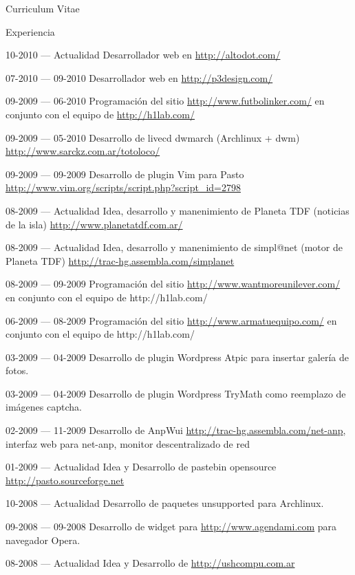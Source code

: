\documentclass[a4paper]{article}
\begin{document}
\begin{cv}{Curriculum Vitae}
    \newpage
    \begin{cvlist}{Experiencia}
      \item[10-2010 --- Actualidad] Desarrollador web en \url{http://altodot.com/}
      \item[07-2010 --- 09-2010] Desarrollador web en \url{http://p3design.com/}
      \item[09-2009 --- 06-2010] Programación del sitio \url{http://www.futbolinker.com/} en conjunto con el equipo de \url{http://h1lab.com/}
      \item[09-2009 --- 05-2010] Desarrollo de livecd dwmarch (Archlinux + dwm) \url{http://www.sarckz.com.ar/totoloco/}
      \item[09-2009 --- 09-2009] Desarrollo de plugin Vim para Pasto \url{http://www.vim.org/scripts/script.php?script_id=2798}
      \item[08-2009 --- Actualidad] Idea, desarrollo y manenimiento de Planeta TDF (noticias de la isla) \url{http://www.planetatdf.com.ar/}
      \item[08-2009 --- Actualidad] Idea, desarrollo y manenimiento de simpl@net (motor de Planeta TDF) \url{http://trac-hg.assembla.com/simplanet}
      \item[08-2009 --- 09-2009] Programación del sitio \url{http://www.wantmoreunilever.com/} en conjunto con el equipo de {http://h1lab.com/}
      \item[06-2009 --- 08-2009] Programación del sitio \url{http://www.armatuequipo.com/} en conjunto con el equipo de {http://h1lab.com/}
      \item[03-2009 --- 04-2009] Desarrollo de plugin Wordpress Atpic para insertar galería de fotos.
      \item[03-2009 --- 04-2009] Desarrollo de plugin Wordpress TryMath como reemplazo de imágenes captcha.
      \item[02-2009 --- 11-2009] Desarrollo de AnpWui \url{http://trac-hg.assembla.com/net-anp}, interfaz web para net-anp, monitor descentralizado de red 
      \item[01-2009 --- Actualidad] Idea y Desarrollo de pastebin opensource \url{http://pasto.sourceforge.net}
      \item[10-2008 --- Actualidad] Desarrollo de paquetes unsupported para Archlinux.
      \item[09-2008 --- 09-2008] Desarrollo de widget para \url{http://www.agendami.com} para navegador Opera.
      \item[08-2008 --- Actualidad] Idea y Desarrollo de \url{http://ushcompu.com.ar}

\end{cvlist}
\end{cv}
\end{document}
